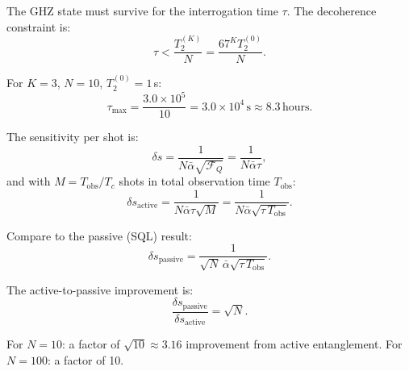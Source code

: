 \documentclass[11pt]{article}
\theoremstyle{definition}
\theoremstyle{remark}
\begin{document}
The GHZ state must survive for the interrogation time $\tau$. The
decoherence constraint is:
\begin{equation}
\tau < \frac{T_2^{(K)}}{N} = \frac{67^K T_2^{(0)}}{N}.
\label{eq:tau-max}
\end{equation}

For $K=3$, $N=10$, $T_2^{(0)} = 1$\,s:
\begin{equation}
\tau_{\max} = \frac{3.0 \times 10^5}{10} = 3.0 \times 10^4\,\mathrm{s}
\approx 8.3\,\mathrm{hours}.
\end{equation}

The sensitivity per shot is:
\begin{equation}
\delta s = \frac{1}{N \bar{\alpha} \sqrt{\mathcal{F}_Q}} = \frac{1}{N \bar{\alpha} \tau},
\end{equation}
and with $M = T_{\mathrm{obs}}/T_c$ shots in total observation time
$T_{\mathrm{obs}}$:
\begin{equation}
\boxed{\delta s_{\mathrm{active}} = \frac{1}{N \bar{\alpha} \tau \sqrt{M}}
= \frac{1}{N \bar{\alpha} \sqrt{\tau \, T_{\mathrm{obs}}}}.}
\label{eq:active-sensitivity}
\end{equation}

Compare to the passive (SQL) result:
\begin{equation}
\delta s_{\mathrm{passive}} = \frac{1}{\sqrt{N} \, \bar{\alpha} \sqrt{\tau \, T_{\mathrm{obs}}}}.
\end{equation}

The active-to-passive improvement is:
\begin{equation}
\frac{\delta s_{\mathrm{passive}}}{\delta s_{\mathrm{active}}} = \sqrt{N}.
\end{equation}

For $N = 10$: a factor of $\sqrt{10} \approx 3.16$ improvement from
active entanglement. For $N = 100$: a factor of 10.
\end{document}
